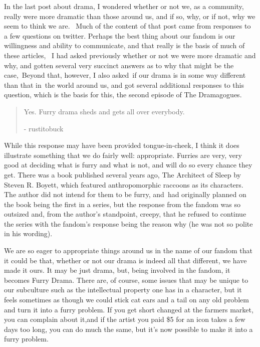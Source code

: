 In the last post about drama, I wondered whether or not we, as a
community, really were more dramatic than those around us, and if so,
why, or if not, why we seem to think we are. ~Much of the content of
that post came from responses to a few questions on twitter. Perhaps the
best thing about our fandom is our willingness and ability to
communicate, and that really is the basis of much of these articles, ~I
had asked previously whether or not we were more dramatic and why, and
gotten several very succinct answers as to why that might be the
case,~Beyond that, however, I also asked~if our drama is in some way
different than that in~the world around us, and got several additional
responses to this question, which is the basis for this, the second
episode of The Dramagogues.

\begin{quote}
Yes. Furry drama sheds and gets all over everybody.

- rustitobuck
\end{quote}

While this response may have been provided tongue-in-cheek, I think it
does illustrate something that we do fairly well: appropriate. Furries
are very, very good at deciding what is furry and what is not, and will
do so every chance they get. There was a book published several years
ago, The Architect of Sleep by Steven R. Boyett, which featured
anthropomorphic raccoons as its characters. The author did not intend
for them to be furry, and~had originally planned on the book being the
first in a series, but the response from the fandom was so outsized and,
from the author's standpoint, creepy, that he refused to continue the
series with the fandom's response being the reason why (he was not so
polite in his wording).

We are so eager to appropriate things around us in the name of our
fandom that it could be that, whether or not our drama is indeed all
that different, we have made it ours. It may be just drama, but, being
involved in the fandom, it becomes Furry Drama. There are, of course,
some issues that may be unique to our subculture such as the
intellectual property one has in a character, but it feels sometimes as
though we could stick cat ears and a tail on any old problem and turn it
into a furry problem. If you get short changed at the farmers market,
you can complain about it,and if the artist you paid \$5 for an icon
takes a few days too long, you can do much the same, but it's now
possible to make it into a furry problem.

